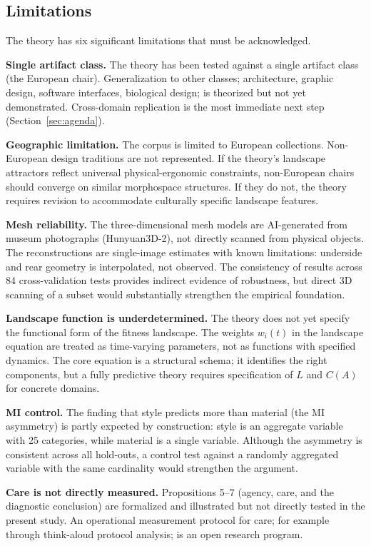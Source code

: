 \subsection{Limitations}

The theory has six significant limitations that must be acknowledged.

\textbf{Single artifact class.} The theory has been tested against a single artifact class (the European chair). Generalization to other classes; architecture, graphic design, software interfaces, biological design; is theorized but not yet demonstrated. Cross-domain replication is the most immediate next step (Section~\ref{sec:agenda}).

\textbf{Geographic limitation.} The corpus is limited to European collections. Non-European design traditions are not represented. If the theory's landscape attractors reflect universal physical-ergonomic constraints, non-European chairs should converge on similar morphospace structures. If they do not, the theory requires revision to accommodate culturally specific landscape features.

\textbf{Mesh reliability.} The three-dimensional mesh models are AI-generated from museum photographs (Hunyuan3D-2), not directly scanned from physical objects. The reconstructions are single-image estimates with known limitations: underside and rear geometry is interpolated, not observed. The consistency of results across 84 cross-validation tests provides indirect evidence of robustness, but direct 3D scanning of a subset would substantially strengthen the empirical foundation.

\textbf{Landscape function is underdetermined.} The theory does not yet specify the functional form of the fitness landscape. The weights $w_i(t)$ in the landscape equation are treated as time-varying parameters, not as functions with specified dynamics. The core equation is a structural schema; it identifies the right components, but a fully predictive theory requires specification of $L$ and $C(A)$ for concrete domains.

\textbf{MI control.} The finding that style predicts more than material (the MI asymmetry) is partly expected by construction: style is an aggregate variable with 25 categories, while material is a single variable. Although the asymmetry is consistent across all hold-outs, a control test against a randomly aggregated variable with the same cardinality would strengthen the argument.

\textbf{Care is not directly measured.} Propositions 5--7 (agency, care, and the diagnostic conclusion) are formalized and illustrated but not directly tested in the present study. An operational measurement protocol for care; for example through think-aloud protocol analysis; is an open research program.

